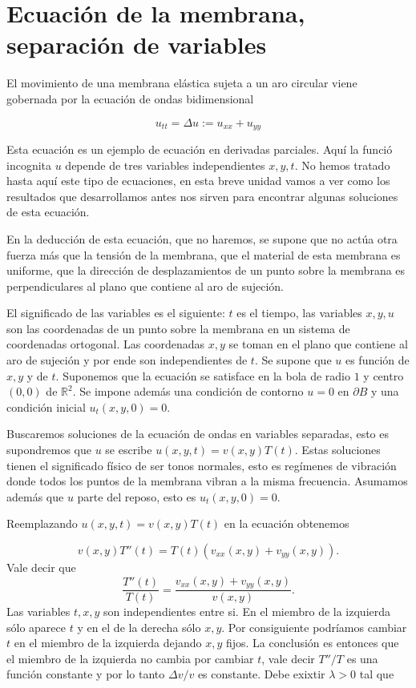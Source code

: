 \documentclass{article}
\newcounter{ejem_cont}
\renewcommand{\emph}[1]{\textcolor[rgb]{0,0,1}{#1}}
\begin{document}
\section{Ecuación de la membrana, separación de variables}

El movimiento de una membrana elástica sujeta a un aro circular viene gobernada por la ecuación de \emph{ondas bidimensional}

\[ u_{tt}=\Delta u:=u_{xx}+u_{yy}\]

Esta ecuación es un ejemplo de \emph{ecuación en derivadas parciales}. Aquí la funció incognita $u$ depende de tres variables independientes $x,y,t$. No hemos tratado hasta aquí este tipo de ecuaciones, en esta breve unidad vamos a ver como los resultados que desarrollamos antes  nos sirven para encontrar algunas soluciones de esta ecuación.  

En la deducción de esta ecuación, que no haremos, se supone que no actúa otra fuerza más que la tensión de la membrana, que el material de esta membrana es uniforme, que la dirección de desplazamientos de un punto sobre la membrana es perpendiculares al plano que contiene al aro de sujeción. 

El significado de las variables es el siguiente: $t$ es el tiempo, las variables $x,y,u$ son las coordenadas de un punto sobre la membrana en un sistema de coordenadas ortogonal. Las coordenadas $x,y$     se toman en el plano que contiene al aro de sujeción y por ende son independientes de $t$. Se supone que $u$ es función de $x,y$ y de $t$. Suponemos que la ecuación  se satisface en la bola de radio $1$ y centro $(0,0)$ de $\mathbb{R}^2$.  Se impone además una \emph{condición de contorno} $u=0$ en $\partial B$ y una \emph{condición inicial}  $u_t(x,y,0)=0$.

 Buscaremos soluciones de la ecuación de ondas en variables separadas, esto es supondremos que $u$ se escribe  $u(x,y,t)=v(x,y)T(t)$. Estas soluciones tienen el significado físico de ser tonos normales, esto es regímenes de vibración donde todos los puntos de la membrana vibran a la misma frecuencia. Asumamos además  que $u$ parte del reposo, esto es $u_t(x,y,0)=0$. 

Reemplazando $u(x,y,t)=v(x,y)T(t)$ en la ecuación obtenemos

\[v(x,y)T''(t)=T(t)\left(v_{xx}(x,y)+v_{yy}(x,y) \right).\]
Vale decir que
\[\frac{T''(t)}{T(t) }=\frac{v_{xx}(x,y)+v_{yy}(x,y)}{v(x,y)}.\]
Las variables $t,x,y$ son independientes entre si.  En el miembro de la izquierda sólo aparece $t$ y en el de la derecha sólo $x,y$.  Por consiguiente  podríamos cambiar $t$ en el miembro de la izquierda dejando $x,y$ fijos. La conclusión es entonces que el miembro de la izquierda no cambia por cambiar $t$, vale decir $T''/T$ es una función constante y por lo tanto $\Delta v/v$ es constante. Debe exixtir $\lambda>0$ tal que
 
\end{document}
